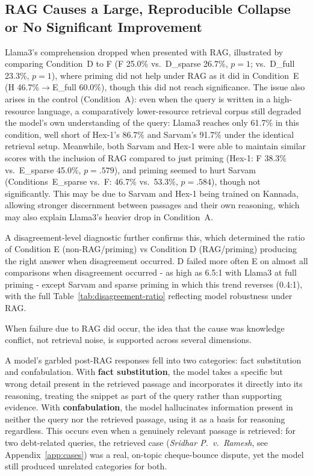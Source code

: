 \documentclass[11pt]{article}
\begin{document}
\subsection{RAG Causes a Large, Reproducible Collapse or No Significant Improvement}
\label{subsec:rag-collapse}
Llama3's comprehension dropped when presented with RAG, illustrated by comparing Condition\ D to F (F 25.0\% vs.\ D\_sparse 26.7\%, $p=1$; vs.\ D\_full 23.3\%, $p=1$), where priming did not help under RAG as it did in Condition\ E (H 46.7\%$\to$E\_full 60.0\%), though this did not reach significance. The issue also arises in the control (Condition\ A): even when the query is written in a high-resource language, a comparatively lower-resource retrieval corpus still degraded the model's own understanding of the query: Llama3 reaches only 61.7\% in this condition, well short of Hex-1's 86.7\% and Sarvam's 91.7\% under the identical retrieval setup. Meanwhile, both Sarvam and Hex-1 were able to maintain similar scores with the inclusion of RAG compared to just priming (Hex-1: F 38.3\% vs.\ E\_sparse 45.0\%, $p=.579$), and priming seemed to hurt Sarvam (Conditions\ E\_sparse vs.\ F: 46.7\% vs.\ 53.3\%, $p=.584$), though not significantly. This may be due to Sarvam and Hex-1 being trained on Kannada, allowing stronger discernment between passages and their own reasoning, which may also explain Llama3's heavier drop in Condition\ A.

A disagreement-level diagnostic further confirms this, which determined the ratio of Condition E (non-RAG/priming) vs Condition D (RAG/priming) producing the right answer when disagreement occurred. D failed more often E on almost all comparisons when disagreement occurred  - as high as 6.5:1 with Llama3 at full priming - except Sarvam and sparse priming in which this trend reverses (0.4:1), with the full Table~\ref{tab:disagreement-ratio} reflecting model robustness under RAG. 

When failure due to RAG did occur, the idea that the cause was knowledge conflict, not retrieval noise, is supported across several dimensions.

A model's garbled post-RAG responses fell into two categories: fact substitution and confabulation. With \textbf{fact substitution}, the model takes a specific but wrong detail present in the retrieved passage and incorporates it directly into its reasoning, treating the snippet as part of the query rather than supporting evidence. With \textbf{confabulation}, the model hallucinates information present in neither the query nor the retrieved passage, using it as a basis for reasoning regardless. This occurs even when a genuinely relevant passage is retrieved: for two debt-related queries, the retrieved case (\textit{Sridhar P.\ v.\ Ramesh}, see Appendix~\ref{app:cases}) was a real, on-topic cheque-bounce dispute, yet the model still produced unrelated categories for both.
\end{document}
